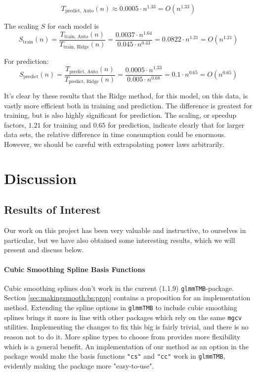 \documentclass[12pt, twoside,hidelinks]{article}
\theoremstyle{definition}
\numberwithin{equation}{section}
\begin{document}
\[
T_{\text{predict, Auto}}(n) \approx 0.0005 \cdot n^{1.33} = O(n^{1.33})
\]
\newline

The scaling $S$ for each model is
\newline
\[
S_{\text{train}}(n) = \frac{T_{\text{train, Auto}}(n)}{T_{\text{train, Ridge}}(n)} = \frac{0.0037 \cdot n^{1.64}}{0.045 \cdot n^{0.43}} = 0.0822 \cdot n^{1.21} = O(n^{1.21})
\]

For prediction:
\[
S_{\text{predict}}(n) = \frac{T_{\text{predict, Auto}}(n)}{T_{\text{predict, Ridge}}(n)} = \frac{0.0005 \cdot n^{1.33}}{0.005 \cdot n^{0.68}} = 0.1 \cdot n^{0.65} = O(n^{0.65})
\]

It's clear by these results that the Ridge method, for this model, on this data, is vastly more efficient both in training and prediction. The difference is greatest for training, but is also highly significant for prediction. The scaling, or speedup factors, $1.21$ for training and $0.65$ for prediction, indicate clearly that for larger data sets, the relative difference in time consumption could be enormous. However, we should be careful with extrapolating power laws arbitrarily. 


\section{Discussion}\label{sec:discussion}

\subsection{Results of Interest}\label{sec:Results}

Our work on this project has been very valuable and instructive, to ourselves in particular, but we have also obtained some interesting results, which we will present and discuss below.

\paragraph{Cubic Smoothing Spline Basis Functions}

Cubic smoothing splines don't work in the current (1.1.9) \texttt{glmmTMB}-package. Section \ref{sec:makingsmooth:bs:prop} contains a proposition for an implementation method. Extending the spline options in \texttt{glmmTMB} to include cubic smoothing splines brings it more in line with other packages which rely on the same \texttt{mgcv} utilities. Implementing the changes to fix this big is fairly trivial, and there is no reason not to do it. More spline types to choose from provides more flexibility which is a general benefit. An implementation of our method as an option in the package would make the basis functions \texttt{"cs"} and \texttt{"cc"} work in \texttt{glmmTMB}, evidently making the package more "easy-to-use".
\end{document}
